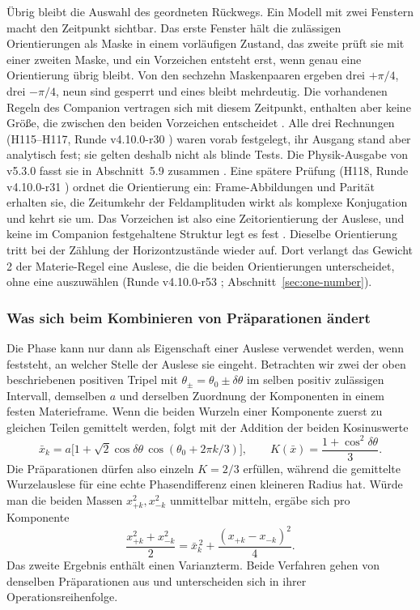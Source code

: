 Übrig bleibt die Auswahl des geordneten Rückwegs. Ein Modell mit zwei
Fenstern macht den Zeitpunkt sichtbar. Das erste Fenster hält die
zulässigen Orientierungen als Maske in einem vorläufigen Zustand, das
zweite prüft sie mit einer zweiten Maske, und ein Vorzeichen entsteht erst,
wenn genau eine Orientierung übrig bleibt. Von den sechzehn Maskenpaaren
ergeben drei \(+\pi/4\), drei \(-\pi/4\), neun sind gesperrt und eines
bleibt mehrdeutig. Die vorhandenen Regeln des Companion vertragen sich mit
diesem Zeitpunkt, enthalten aber keine Größe, die zwischen den beiden
Vorzeichen entscheidet \cite{h117}. Alle drei Rechnungen (H115--H117,
Runde v4.10.0-r30 \cite{companion}) waren vorab
festgelegt, ihr Ausgang stand aber analytisch fest; sie gelten deshalb
nicht als blinde Tests. Die Physik-Ausgabe von v5.3.0 fasst sie in Abschnitt~5.9 zusammen \cite{physics}.
Eine spätere Prüfung (H118, Runde v4.10.0-r31 \cite{layers}) ordnet die
Orientierung ein: Frame-Abbildungen und
Parität erhalten sie, die Zeitumkehr der Feldamplituden wirkt als komplexe
Konjugation und kehrt sie um. Das Vorzeichen ist also eine Zeitorientierung
der Auslese, und keine im Companion festgehaltene Struktur legt es fest
\cite{h118}. Dieselbe Orientierung tritt bei der Zählung der
Horizontzustände wieder auf. Dort verlangt das Gewicht 2 der
Materie-Regel eine Auslese, die die beiden Orientierungen unterscheidet,
ohne eine auszuwählen (Runde v4.10.0-r53 \cite{layers};
Abschnitt~\ref{sec:one-number}).

\subsubsection{Was sich beim Kombinieren von Präparationen ändert}

Die Phase kann nur dann als Eigenschaft einer Auslese
verwendet werden, wenn feststeht, an welcher Stelle der
Auslese sie eingeht. Betrachten wir zwei der oben
beschriebenen positiven Tripel mit \(\theta_\pm=\theta_0\pm\delta\theta\)
im selben positiv zulässigen Intervall, demselben \(a\)
und derselben Zuordnung der Komponenten in einem
festen Materieframe. Wenn die beiden Wurzeln einer
Komponente zuerst zu gleichen Teilen gemittelt werden,
folgt mit der Addition der beiden Kosinuswerte
\begin{equation}
 \bar x_k=a\bigl[1+\sqrt2\cos\delta\theta\,
                      \cos(\theta_0+2\pi k/3)\bigr],\qquad
 K(\bar x)=\frac{1+\cos^2\delta\theta}{3}.
 \label{eq:koide-mixture}
\end{equation}
Die Präparationen dürfen also einzeln \(K=2/3\) erfüllen,
während die gemittelte Wurzelauslese für eine echte
Phasendifferenz einen kleineren Radius hat. Würde man die
beiden Massen \(x_{+k}^2,x_{-k}^2\) unmittelbar mitteln,
ergäbe sich pro Komponente
\[
 \frac{x_{+k}^2+x_{-k}^2}{2}
   =\bar x_k^{\,2}+\frac{(x_{+k}-x_{-k})^2}{4}.
\]
Das zweite Ergebnis enthält einen Varianzterm. Beide
Verfahren gehen von denselben Präparationen aus und
unterscheiden sich in ihrer Operationsreihenfolge.


